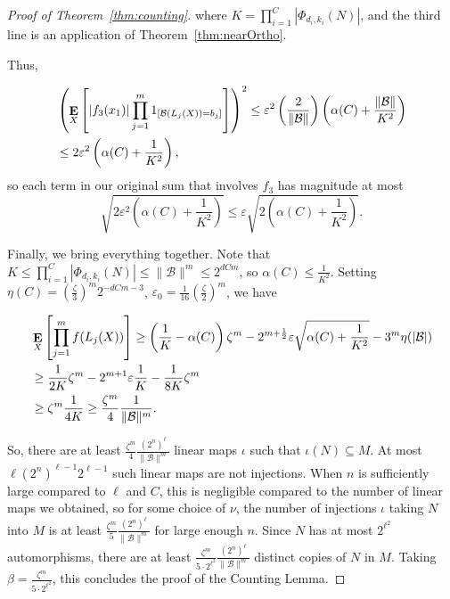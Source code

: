 \documentclass{article}
\theoremstyle{plain}
\theoremstyle{definition}
\theoremstyle{definition}
\theoremstyle{remark}
\numberwithin{equation}{section}
\newcommand{\Esymb}{{\bf E}}
\DeclareMathOperator*{\E}{\Esymb}
\newcommand{\cB}{\mathcal B}
\begin{document}
\begin{proof}[Proof of Theorem~\ref{thm:counting}]
\noindent where $K=\prod_{i=1}^C |\Phi_{d_i,k_i}(N)|$, and the third line is an application of Theorem~\ref{thm:nearOrtho}.

Thus,

\begin{align*}
    & \left(\E_{X}\left[ \left|f_{3}(x_1)\right|\prod_{j=1}^m 1_{[\cB(L_j(X))=b_j]}\right]\right)^2 \leq \varepsilon^2 \left(\frac{2}{\|\cB\|}\right) \left(\alpha(C)+\frac{\|\cB\|}{K^2}\right)\\
    & \leq 2\varepsilon^2 \left(\alpha(C)+\frac{1}{K^2}\right),
\end{align*}
so each term in our original sum that involves $f_3$ has magnitude at most
\[ \sqrt{2\varepsilon^2 \left(\alpha(C)+\frac{1}{K^2}\right)}\leq \varepsilon \sqrt{2\left(\alpha(C)+\frac{1}{K^2}\right)}.\]

Finally, we bring everything together. Note that $K\leq \prod_{i=1}^C |\Phi_{d_i,k_i}(N)|\leq \|\cB\|^m \leq 2^{dCm}$, so $\alpha(C)\leq \frac{1}{K^2}$. Setting $\eta(C) = \left(\frac{\zeta}{3}\right)^m 2^{-dCm-3}$, $\varepsilon_0=\frac{1}{16}\left(\frac{\zeta}{2}\right)^m$, we have

\begin{align*}
    & \E_{X}\left[\prod_{j=1}^m f(L_j(X))\right] \geq \left(\frac{1}{K} - \alpha(C)\right) \zeta^m - 2^{m+\frac{1}{2}} \varepsilon \sqrt{\alpha(C)+\frac{1}{K^2}} - 3^m \eta(|\cB|) \\
    & \geq \frac{1}{2K} \zeta^m - 2^{m+1} \varepsilon \frac{1}{K} - \frac{1}{8K}\zeta^m \\
    & \geq \zeta^m \frac{1}{4K} \geq \frac{\zeta^m}{4} \frac{1}{\|\cB\|^m}.
\end{align*}

So, there are at least $\frac{\zeta^m}{4} \frac{(2^n)^\ell}{\|\cB\|^m}$ linear maps $\iota$ such that $\iota(N)\subseteq M$. At most $\ell (2^n)^{\ell-1}2^{\ell-1}$ such linear maps are not injections. When $n$ is sufficiently large compared to $\ell$ and $C$, this is negligible compared to the number of linear maps we obtained, so for some choice of $\nu$, the number of injections $\iota$ taking $N$ into $M$ is at least $\frac{\zeta^m}{5} \frac{(2^n)^\ell}{\|\cB\|^m}$ for large enough $n$. Since $N$ has at most $2^{\ell^2}$ automorphisms, there are at least $\frac{\zeta^m}{5\cdot 2^{\ell^2}} \frac{(2^n)^\ell}{\|\cB\|^m}$ distinct copies of $N$ in $M$. Taking $\beta=\frac{\zeta^m}{5\cdot 2^{\ell^2}}$, this concludes the proof of the Counting Lemma.

\end{proof}
\end{document}
